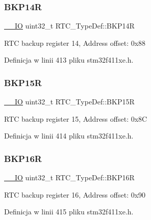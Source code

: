 \subsubsection{\texorpdfstring{B\+K\+P14R}{BKP14R}}
{\footnotesize\ttfamily \hyperlink{core__sc300_8h_aec43007d9998a0a0e01faede4133d6be}{\+\_\+\+\_\+\+IO} uint32\+\_\+t R\+T\+C\+\_\+\+Type\+Def\+::\+B\+K\+P14R}

R\+TC backup register 14, Address offset\+: 0x88 

Definicja w linii 413 pliku stm32f411xe.\+h.

\mbox{\label{struct_r_t_c___type_def_a797f43f9cc1858baebd1799be288dff6}} 
\subsubsection{\texorpdfstring{B\+K\+P15R}{BKP15R}}
{\footnotesize\ttfamily \hyperlink{core__sc300_8h_aec43007d9998a0a0e01faede4133d6be}{\+\_\+\+\_\+\+IO} uint32\+\_\+t R\+T\+C\+\_\+\+Type\+Def\+::\+B\+K\+P15R}

R\+TC backup register 15, Address offset\+: 0x8C 

Definicja w linii 414 pliku stm32f411xe.\+h.

\mbox{\label{struct_r_t_c___type_def_a181ad73082bde7d74010aac16bd373fc}} 
\subsubsection{\texorpdfstring{B\+K\+P16R}{BKP16R}}
{\footnotesize\ttfamily \hyperlink{core__sc300_8h_aec43007d9998a0a0e01faede4133d6be}{\+\_\+\+\_\+\+IO} uint32\+\_\+t R\+T\+C\+\_\+\+Type\+Def\+::\+B\+K\+P16R}

R\+TC backup register 16, Address offset\+: 0x90 

Definicja w linii 415 pliku stm32f411xe.\+h.

\mbox{\label{struct_r_t_c___type_def_a90a305a8e00b357f28daef5041e5a8b1}} 
